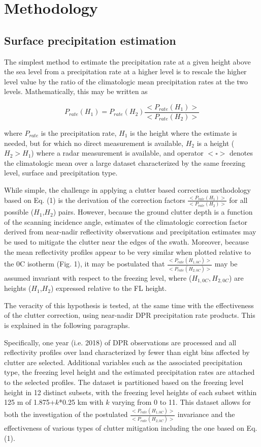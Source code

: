 \documentclass{article}
\begin{document}
    
\section*{Methodology}
\subsection*{Surface precipitation estimation}
    
The simplest method to estimate the precipitation rate at a given height
above the sea level from a precipitation rate at a higher level is to
rescale the higher level value by the ratio of the climatologic mean
precipitation rates at the two levels. Mathematically, this may be
written as
    
    \begin{equation}
    P_{rate}(H_1)=P_{rate}(H_2) \frac {<P_{rate}(H_1)>} {<P_{rate}(H_2)>} 
    \end{equation}

where $P_{rate}$ is the precipitation rate, $H_1$ is the height where the
estimate is needed, but for which no direct measurement is available,
$H_2$ is a height ($H_2>H_1$) where a radar
measurement is available, and operator $<\square>$ denotes the
climatologic mean over a large dataset characterized by the same
freezing level, surface and precipitation type.
    
While simple, the challenge in applying a clutter based correction
methodology based on Eq. (1) is the derivation of the correction factors
$\frac {<P_{rate}(H_1)>} {<P_{rate}(H_2)>}$ for all possible ($H_1$,$H_2$)
pairs. However, because the ground clutter depth is a function of the
scanning incidence angle, estimates of the climatologic correction
factor derived from near-nadir reflectivity observations and
precipitation estimates may be used to mitigate the clutter near the
edges of the swath. Moreover, because the mean reflectivity profiles
appear to be very similar when plotted relative to the 0C isotherm (Fig. 1), it may be postulated that 
$\frac {<P_{rate}(H_{1,0C})>} {<P_{rate}(H_{2,0C})>}$
may be assumed invariant with respect to the freezing level, where
($H_{1,0C},H_{2,0C}$) are heights ($H_1$,$H_2$) expressed
relative to the FL height.
    
The veracity of this hypothesis is tested, at the same time with the
effectiveness of the clutter correction, using near-nadir DPR
precipitation rate products. This is explained in the following
paragraphs.
    
Specifically, one year (i.e. 2018) of DPR observations are processed and
all reflectivity profiles over land characterized by fewer than eight
bins affected by clutter are selected. Additional variables such as the
associated precipitation type, the freezing level height and the
estimated precipitation rates are attached to the selected profiles.
The dataset is partitioned
based on the freezing level height in 12 distinct subsets, with the
freezing level heights of each subset within 125 m of 1.875+$k$*0.25
km with $k$ varying from 0 to 11. This dataset allows for both the
investigation of the postulated
$\frac {<P_{rate}(H_{1,0C})>} {<P_{rate}(H_{2,0C})>}$ invariance and the
effectiveness of various types of clutter mitigation including 
the one based on Eq. (1).
    
\end{document}
